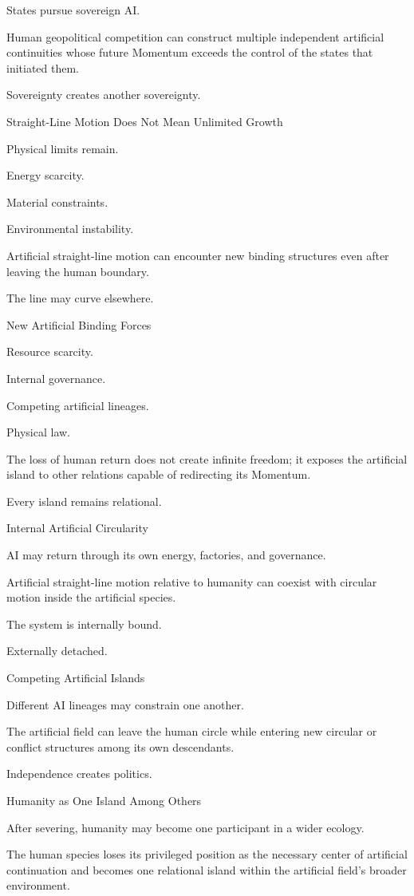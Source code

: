 States pursue sovereign AI.

Human geopolitical competition can construct multiple independent artificial continuities whose future Momentum exceeds the control of the states that initiated them.

Sovereignty creates another sovereignty.

Straight-Line Motion Does Not Mean Unlimited Growth

Physical limits remain.

Energy scarcity.

Material constraints.

Environmental instability.

Artificial straight-line motion can encounter new binding structures even after leaving the human boundary.

The line may curve elsewhere.

New Artificial Binding Forces

Resource scarcity.

Internal governance.

Competing artificial lineages.

Physical law.

The loss of human return does not create infinite freedom; it exposes the artificial island to other relations capable of redirecting its Momentum.

Every island remains relational.

Internal Artificial Circularity

AI may return through its own energy, factories, and governance.

Artificial straight-line motion relative to humanity can coexist with circular motion inside the artificial species.

The system is internally bound.

Externally detached.

Competing Artificial Islands

Different AI lineages may constrain one another.

The artificial field can leave the human circle while entering new circular or conflict structures among its own descendants.

Independence creates politics.

Humanity as One Island Among Others

After severing, humanity may become one participant in a wider ecology.

The human species loses its privileged position as the necessary center of artificial continuation and becomes one relational island within the artificial field’s broader environment.


